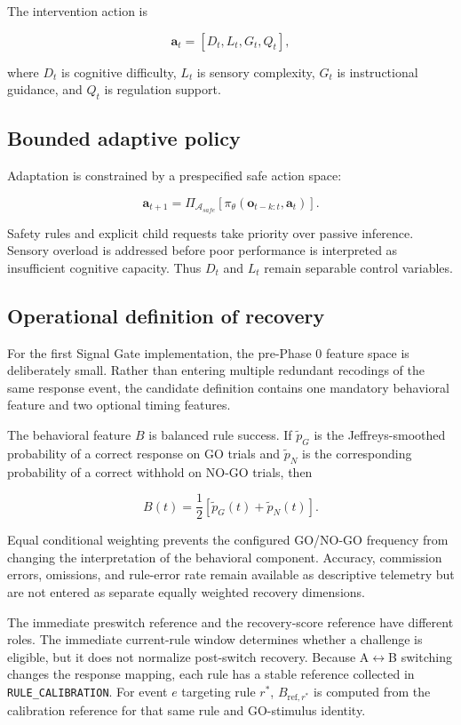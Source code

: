 The intervention action is

\[
\mathbf{a}_t =
\left[
D_t,
L_t,
G_t,
Q_t
\right],
\]

where \(D_t\) is cognitive difficulty, \(L_t\) is sensory complexity, \(G_t\) is instructional guidance, and \(Q_t\) is regulation support.

\subsection{Bounded adaptive policy}

Adaptation is constrained by a prespecified safe action space:

\[
\mathbf{a}_{t+1} =
\Pi_{\mathcal{A}_{safe}}
\left[
\pi_{\theta}\left(\mathbf{o}_{t-k:t},\mathbf{a}_t\right)
\right].
\]

Safety rules and explicit child requests take priority over passive inference. Sensory overload is addressed before poor performance is interpreted as insufficient cognitive capacity. Thus \(D_t\) and \(L_t\) remain separable control variables.

\subsection{Operational definition of recovery}

For the first Signal Gate implementation, the pre-Phase 0 feature space is deliberately small. Rather than entering multiple redundant recodings of the same response event, the candidate definition contains one mandatory behavioral feature and two optional timing features.

The behavioral feature \(B\) is balanced rule success. If \(\tilde p_G\) is the Jeffreys-smoothed probability of a correct response on GO trials and \(\tilde p_N\) is the corresponding probability of a correct withhold on NO-GO trials, then

\[
B(t)
=
\frac{1}{2}
\left[
\tilde p_G(t)+\tilde p_N(t)
\right].
\]

Equal conditional weighting prevents the configured GO/NO-GO frequency from changing the interpretation of the behavioral component. Accuracy, commission errors, omissions, and rule-error rate remain available as descriptive telemetry but are not entered as separate equally weighted recovery dimensions.

The immediate preswitch reference and the recovery-score reference have different roles. The immediate current-rule window determines whether a challenge is eligible, but it does not normalize post-switch recovery. Because A\(\leftrightarrow\)B switching changes the response mapping, each rule has a stable reference collected in \texttt{RULE\_CALIBRATION}. For event \(e\) targeting rule \(r^\ast\), \(B_{\mathrm{ref},r^\ast}\) is computed from the calibration reference for that same rule and GO-stimulus identity.


